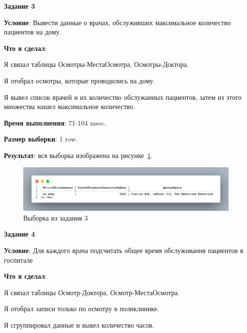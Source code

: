 
\begin{center}
  \textbf{Задание 3}
\end{center}
  
\textbf{Условие}:
Вывести данные о врачах, обслуживших максимальное количество пациентов на дому.
  
\textbf{Что я сделал}:

Я связал таблицы Осмотры-МестаОсмотра, Осмотры-Доктора.

Я отобрал осмотры, которые проводились на дому.

Я вывел список врачей и их количество обслужанных пациентов,
затем из этого множества нашел максимальное количество.



\textbf{Время выполнения}: 71-104 msec.

\textbf{Размер выборки}: 1 row.

\textbf{Результат}: вся выборка изображена на рисунке~\ref{fig:t3}.

\begin{figure}[!h]
  \centering

  \includegraphics[width=16cm]
  {../sql/task3/3-out.png}

  \caption{Выборка из задания 3}

  \label{fig:t3}
\end{figure}


\begin{center}
  \textbf{Задание 4}
\end{center}
  
\textbf{Условие}:
Для каждого врача подсчитать общее время обслуживания пациентов в госпитале
  
\textbf{Что я сделал}:

Я связал таблицы Осмотр-Доктора, Осмотр-МестаОсмотра.

Я отобрал записи только по осмотру в поликлинике.

Я сгруппировал данные и вывел количество часов.



